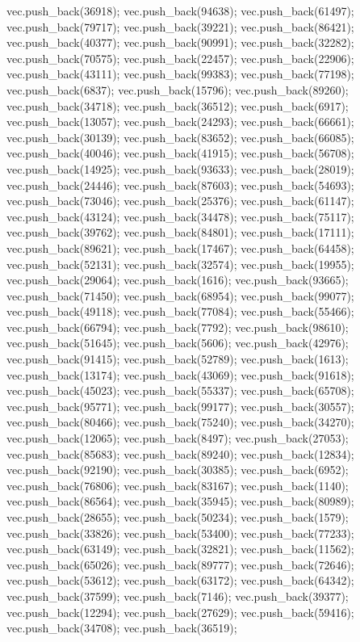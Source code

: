 vec.push_back(36918);
vec.push_back(94638);
vec.push_back(61497);
vec.push_back(79717);
vec.push_back(39221);
vec.push_back(86421);
vec.push_back(40377);
vec.push_back(90991);
vec.push_back(32282);
vec.push_back(70575);
vec.push_back(22457);
vec.push_back(22906);
vec.push_back(43111);
vec.push_back(99383);
vec.push_back(77198);
vec.push_back(6837);
vec.push_back(15796);
vec.push_back(89260);
vec.push_back(34718);
vec.push_back(36512);
vec.push_back(6917);
vec.push_back(13057);
vec.push_back(24293);
vec.push_back(66661);
vec.push_back(30139);
vec.push_back(83652);
vec.push_back(66085);
vec.push_back(40046);
vec.push_back(41915);
vec.push_back(56708);
vec.push_back(14925);
vec.push_back(93633);
vec.push_back(28019);
vec.push_back(24446);
vec.push_back(87603);
vec.push_back(54693);
vec.push_back(73046);
vec.push_back(25376);
vec.push_back(61147);
vec.push_back(43124);
vec.push_back(34478);
vec.push_back(75117);
vec.push_back(39762);
vec.push_back(84801);
vec.push_back(17111);
vec.push_back(89621);
vec.push_back(17467);
vec.push_back(64458);
vec.push_back(52131);
vec.push_back(32574);
vec.push_back(19955);
vec.push_back(29064);
vec.push_back(1616);
vec.push_back(93665);
vec.push_back(71450);
vec.push_back(68954);
vec.push_back(99077);
vec.push_back(49118);
vec.push_back(77084);
vec.push_back(55466);
vec.push_back(66794);
vec.push_back(7792);
vec.push_back(98610);
vec.push_back(51645);
vec.push_back(5606);
vec.push_back(42976);
vec.push_back(91415);
vec.push_back(52789);
vec.push_back(1613);
vec.push_back(13174);
vec.push_back(43069);
vec.push_back(91618);
vec.push_back(45023);
vec.push_back(55337);
vec.push_back(65708);
vec.push_back(95771);
vec.push_back(99177);
vec.push_back(30557);
vec.push_back(80466);
vec.push_back(75240);
vec.push_back(34270);
vec.push_back(12065);
vec.push_back(8497);
vec.push_back(27053);
vec.push_back(85683);
vec.push_back(89240);
vec.push_back(12834);
vec.push_back(92190);
vec.push_back(30385);
vec.push_back(6952);
vec.push_back(76806);
vec.push_back(83167);
vec.push_back(1140);
vec.push_back(86564);
vec.push_back(35945);
vec.push_back(80989);
vec.push_back(28655);
vec.push_back(50234);
vec.push_back(1579);
vec.push_back(33826);
vec.push_back(53400);
vec.push_back(77233);
vec.push_back(63149);
vec.push_back(32821);
vec.push_back(11562);
vec.push_back(65026);
vec.push_back(89777);
vec.push_back(72646);
vec.push_back(53612);
vec.push_back(63172);
vec.push_back(64342);
vec.push_back(37599);
vec.push_back(7146);
vec.push_back(39377);
vec.push_back(12294);
vec.push_back(27629);
vec.push_back(59416);
vec.push_back(34708);
vec.push_back(36519);
